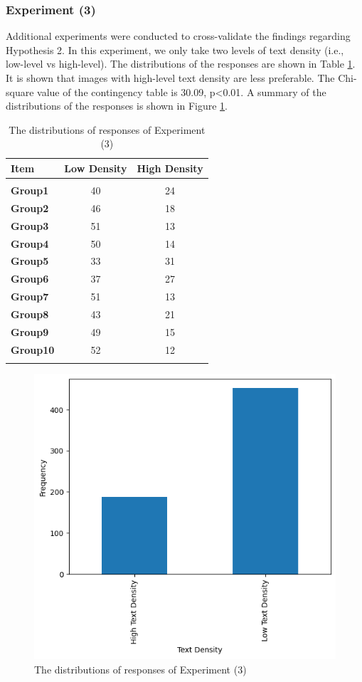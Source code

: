 \documentclass[a4paper]{article}
\begin{document}
\subsubsection{Experiment (3)}
Additional experiments were conducted to cross-validate the findings regarding Hypothesis 2. In this experiment, we only take two levels of text density (i.e., low-level vs high-level). The distributions of the responses are shown in Table \ref{tab: DistExperiment5}. It is shown that images with high-level text density are less preferable. The Chi-square value of the contingency table is 30.09, p<0.01. A summary of the distributions of the responses is shown in Figure \ref{fig:DistExperiment5}.


\begin{table}
\caption{The distributions of responses of Experiment (3)}
\label{tab: DistExperiment5}
\centering

\begin{tabular}{l c c }
\hline
\textbf{Item} & \textbf{Low Density} & \textbf{High Density} \\
\hline \\[-1.8ex]
\textbf{Group1} & 40 & 24 \\
\textbf{Group2} & 46 & 18 \\
\textbf{Group3} & 51 & 13 \\
\textbf{Group4} & 50 & 14 \\
\textbf{Group5} & 33 & 31 \\
\textbf{Group6} & 37 & 27 \\
\textbf{Group7} & 51 & 13 \\
\textbf{Group8} & 43 & 21 \\
\textbf{Group9} & 49 & 15 \\
\textbf{Group10} & 52 & 12 \\
\hline \\[-1.8ex]
\end{tabular}

\end{table}

\begin{figure}
    \centering
    \includegraphics[width=0.75\linewidth]{distexperiment5.png}
    \caption{The distributions of responses of Experiment (3)}
    \label{fig:DistExperiment5}
\end{figure}
\end{document}
